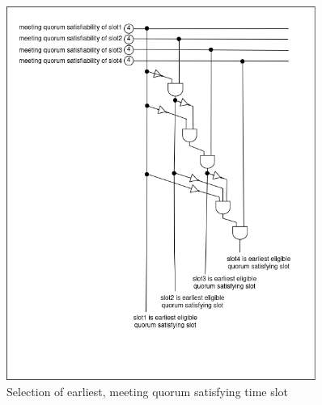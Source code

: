 \begin{figure}[H]
    \centering
    \includegraphics[width=0.9\textwidth]{./image/circuit_diagram/4_earliest_slot_selection.png}
    \caption{Selection of earliest, meeting quorum satisfying time slot}
    \label{fig:selecting earliest, meeting quorum satisfying time slot}
\end{figure} 

